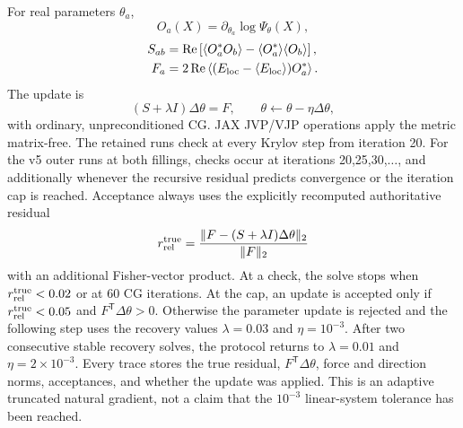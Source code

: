 For real parameters $\theta_a$,
\begin{equation}
 O_a(X)=\partial_{\theta_a}\log\Psi_\theta(X),
\end{equation}
\begin{align}
 S_{ab}&=\operatorname{Re}\left[
 \langle O_a^*O_b\rangle-
 \langle O_a^*\rangle\langle O_b\rangle\right],\\
 F_a&=2\operatorname{Re}\left\langle
 (E_{\rm loc}-\langle E_{\rm loc}\rangle)O_a^*\right\rangle .
\end{align}
The update is
\begin{equation}
 (S+\lambda I)\Delta\theta=F,\qquad
 \theta\leftarrow\theta-\eta\Delta\theta,
 \label{eq:strictsr}
\end{equation}
with ordinary, unpreconditioned CG. JAX JVP/VJP operations apply the metric
matrix-free. The retained runs check at every Krylov step from iteration 20.
For the v5 outer runs at both fillings, checks occur at iterations
20,25,30,$\ldots$, and additionally whenever the recursive residual predicts
convergence or the iteration cap is reached. Acceptance always uses the
explicitly recomputed authoritative residual
\begin{equation}
 r_{\rm rel}^{\rm true}=\frac{\lVert F-(S+\lambda I)\Delta\theta\rVert_2}
 {\lVert F\rVert_2}
\end{equation}
with an additional Fisher-vector product. At a check, the solve stops when
$r_{\rm rel}^{\rm true}<0.02$ or at 60 CG iterations. At the cap, an update
is accepted only if $r_{\rm rel}^{\rm true}<0.05$ and
$F^{\mathsf T}\Delta\theta>0$. Otherwise the parameter update is rejected and
the following step uses the recovery values $\lambda=0.03$ and
$\eta=10^{-3}$. After two consecutive stable recovery solves, the protocol
returns to $\lambda=0.01$ and $\eta=2\times10^{-3}$. Every trace stores the
true residual, $F^{\mathsf T}\Delta\theta$, force and direction norms,
acceptances, and whether the update was applied. This is an adaptive truncated
natural gradient, not a claim that the $10^{-3}$ linear-system tolerance has
been reached.

